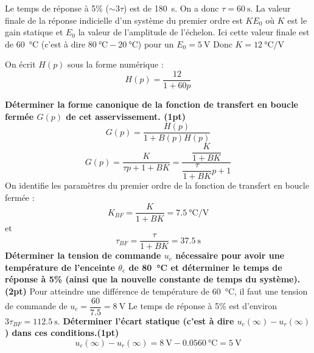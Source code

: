 Le temps de réponse à 5\% ($\sim 3\tau$) est de \SI{180}{\second}. 
On a donc $\tau=\SI{60}{\second}$. 
La valeur finale de la réponse indicielle d'un système du premier ordre est 
$KE_0$ où $K$ est le gain statique et $E_0$ la valeur de l'amplitude de l'échelon.
Ici cette valeur finale est de \SI{60}{\celsius} (c'est à dire 
$\SI{80}{\celsius} -\SI{20}{\celsius}$) pour un $E_0=\SI{5}{\volt}$
Donc $K=\SI{12}{\celsius\per\volt}$

On écrit $H(p)$ sous la forme numérique :
\[
    H(p)=\dfrac{12}{1+60p}
\]

\question{}
\textbf{Déterminer la forme canonique de la fonction de transfert en boucle fermée $G(p)$ 
de cet asservissement.
\textbf{(1pt)}}
\[
    G(p)=\dfrac{H(p)}{1+B(p)H(p)}
\]
\[
    G(p)=\dfrac{K}{\tau p + 1 + BK} = \dfrac{\dfrac{K}{1+BK}}{\dfrac{\tau}{1+BK}p+1}
\]
On identifie les paramètres du premier ordre de la fonction de transfert en 
boucle fermée :
\[
    K_{BF}=\dfrac{K}{1+BK}=\SI{7.5}{\celsius\per\volt}
\]
et
\[
    \tau_{BF}=\dfrac{\tau}{1+BK}=\SI{37.5}{\second}
\]
\question{}
\textbf{Déterminer la tension de commande $u_c$ nécessaire pour avoir une température 
de l'enceinte $\theta_e$ de \SI{80}{\celsius} et déterminer le temps de réponse
à 5\% (ainsi que la nouvelle constante de temps du système).
\textbf{(2pt)}}
Pour atteindre une différence de température de \SI{60}{\celsius}, il faut une tension de
commande de $u_c=\dfrac{60}{7.5}=\SI{8}{\volt}$
Le temps de réponse à 5\% est d'environ $3\tau_{BF}=\SI{112.5}{\second}$.
\question{}
\textbf{Déterminer l'écart statique (c'est à dire $u_c(\infty)-u_r(\infty)$) dans
ces conditions.\textbf{(1pt)}}
\[
    u_c(\infty)-u_r(\infty)=\SI{8}{\volt}-0.05\SI{60}{\celsius}=\SI{5}{\volt}
\]
